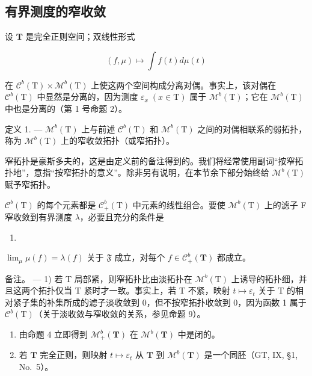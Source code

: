 \subsection{有界测度的窄收敛}

设 \(\mathbf{T}\) 是完全正则空间；双线性形式

\[
(f, \mu) \mapsto \int f (t) d \mu (t)
\]

在 \(\mathcal{C}^{b}(\mathrm{T})\times\mathcal{M}^{b}(\mathrm{T})\) 上使这两个空间构成分离对偶。事实上，该对偶在 \(\mathcal{C}^{b}(\mathrm{T})\) 中显然是分离的，因为测度 \(\varepsilon_{x}\;(x\in\mathrm{T})\) 属于 \(\mathcal{M}^{b}(\mathrm{T})\)；它在 \(\mathcal{M}^{b}(\mathrm{T})\) 中也是分离的（第 1 号命题 2）。

定义 1. --- \(\mathcal{M}^{b}(\mathrm{T})\) 上与前述 \(\mathcal{C}^{b}(\mathrm{T})\) 和 \(\mathcal{M}^{b}(\mathrm{T})\) 之间的对偶相联系的弱拓扑，称为 \(\mathcal{M}^{b}(\mathrm{T})\) 上的窄收敛拓扑（或窄拓扑）。

窄拓扑是豪斯多夫的，这是由定义前的备注得到的。我们将经常使用副词“按窄拓扑地”，意指“按窄拓扑的意义”。除非另有说明，在本节余下部分始终给 \(\mathcal{M}^b (\mathrm{T})\) 赋予窄拓扑。

\(\mathcal{C}^{b}(\mathrm{T})\) 的每个元素都是 \(\mathcal{C}_{+}^{b}(\mathrm{T})\) 中元素的线性组合。要使 \(\mathcal{M}^{b}(\mathrm{T})\) 上的滤子 F 窄收敛到有界测度 \(\lambda\)，必要且充分的条件是

\begin{enumerate}
\def\labelenumi{(\arabic{enumi})}
\setcounter{enumi}{3}
\tightlist
\item
\end{enumerate}

\(\lim_{\mu} \mu(f) = \lambda(f)\) 关于 \(\mathfrak{F}\) 成立，对每个 \(f \in \mathcal{C}_+^b(\mathbf{T})\) 都成立。

备注。 --- 1) 若 T 局部紧，则窄拓扑比由淡拓扑在 \(\mathcal{M}^{b}(\mathrm{T})\) 上诱导的拓扑细，并且这两个拓扑仅当 T 紧时才一致。事实上，若 T 不紧，映射 \(t \mapsto \varepsilon_{t}\) 关于 T 的相对紧子集的补集所成的滤子淡收敛到 0，但不按窄拓扑收敛到 0，因为函数 1 属于 \(\mathcal{C}^{b}(\mathrm{T})\)（关于淡收敛与窄收敛的关系，参见命题 9）。

\begin{enumerate}
\def\labelenumi{\arabic{enumi})}
\setcounter{enumi}{1}
\item
  由命题 4 立即得到 \(\mathcal{M}_+^b (\mathbf{T})\) 在 \(\mathcal{M}^b (\mathbf{T})\) 中是闭的。
\item
  若 \(\mathbf{T}\) 完全正则，则映射 \(t \mapsto \varepsilon_t\) 从 \(\mathbf{T}\) 到 \(\mathcal{M}^b(\mathbf{T})\) 是一个同胚（GT, IX, §1, No.~5）。
\end{enumerate}

